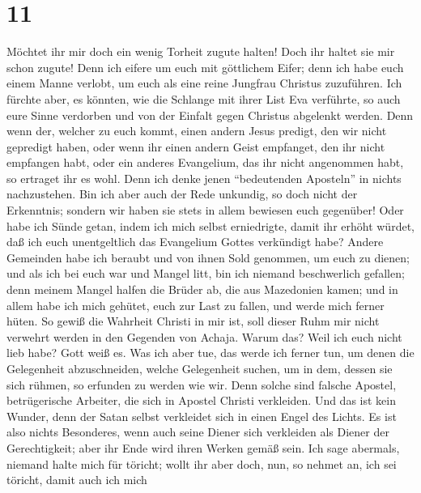 \hypertarget{section-10}{%
\section{11}\label{section-10}}

 Möchtet ihr mir doch ein wenig Torheit zugute halten!
Doch ihr haltet sie mir schon zugute!  Denn ich eifere um
euch mit göttlichem Eifer; denn ich habe euch einem Manne verlobt, um
euch als eine reine Jungfrau Christus zuzuführen.  Ich
fürchte aber, es könnten, wie die Schlange mit ihrer List Eva verführte,
so auch eure Sinne verdorben und von der Einfalt gegen Christus
abgelenkt werden.  Denn wenn der, welcher zu euch kommt,
einen andern Jesus predigt, den wir nicht gepredigt haben, oder wenn ihr
einen andern Geist empfanget, den ihr nicht empfangen habt, oder ein
anderes Evangelium, das ihr nicht angenommen habt, so ertraget ihr es
wohl.  Denn ich denke jenen ``bedeutenden Aposteln'' in
nichts nachzustehen.  Bin ich aber auch der Rede unkundig,
so doch nicht der Erkenntnis; sondern wir haben sie stets in allem
bewiesen euch gegenüber!  Oder habe ich Sünde getan, indem
ich mich selbst erniedrigte, damit ihr erhöht würdet, daß ich euch
unentgeltlich das Evangelium Gottes verkündigt habe? 
Andere Gemeinden habe ich beraubt und von ihnen Sold genommen, um euch
zu dienen; und als ich bei euch war und Mangel litt, bin ich niemand
beschwerlich gefallen;  denn meinem Mangel halfen die
Brüder ab, die aus Mazedonien kamen; und in allem habe ich mich gehütet,
euch zur Last zu fallen, und werde mich ferner hüten.  So
gewiß die Wahrheit Christi in mir ist, soll dieser Ruhm mir nicht
verwehrt werden in den Gegenden von Achaja.  Warum das?
Weil ich euch nicht lieb habe? Gott weiß es.  Was ich
aber tue, das werde ich ferner tun, um denen die Gelegenheit
abzuschneiden, welche Gelegenheit suchen, um in dem, dessen sie sich
rühmen, so erfunden zu werden wie wir.  Denn solche sind
falsche Apostel, betrügerische Arbeiter, die sich in Apostel Christi
verkleiden.  Und das ist kein Wunder, denn der Satan
selbst verkleidet sich in einen Engel des Lichts.  Es ist
also nichts Besonderes, wenn auch seine Diener sich verkleiden als
Diener der Gerechtigkeit; aber ihr Ende wird ihren Werken gemäß sein.
 Ich sage abermals, niemand halte mich für töricht; wollt
ihr aber doch, nun, so nehmet an, ich sei töricht, damit auch ich mich

